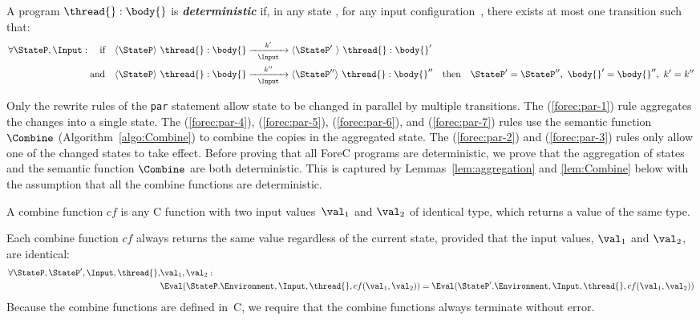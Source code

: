 \begin{definition}
	\label{def:deterministic}
	A program $\thread{}:\body{}$ is \emph{\textbf{deterministic}} if, 
	in any state \StateP{}, for any input configuration~\Input{}, there 
	exists at most one transition such that:
	\begin{align*}
		\forall \StateP, \Input: \quad
		\text{if} \quad
		\langle \StateP \rangle ~ \thread{}:\body{} 
		&	\xrightarrow[~~\Input~~]{k'} 
		\langle \StateP'~ \rangle ~ \thread{}:\body{}'	\\
		\text{and} \quad
		\langle \StateP \rangle ~ \thread{}:\body{} 
		&	\xrightarrow[~~\Input~~]{k''} 
		\langle \StateP'' \rangle ~ \thread{}:\body{}''
		\quad \text{then} \quad 
		\StateP' = \StateP'', ~ \body{}' = \body{}'', ~ k' = k''
	\end{align*}
\end{definition}
Only the rewrite rules of the \verb$par$ statement allow state 
\StateP{} to be changed in parallel by multiple transitions. The
(\ref{forec:par-1}) rule aggregates the changes into a
single state. The (\ref{forec:par-4}), (\ref{forec:par-5}),
(\ref{forec:par-6}), and (\ref{forec:par-7}) rules use the
semantic function $\Combine$ (Algorithm~\ref{algo:Combine})
to combine the copies in the aggregated state. The
(\ref{forec:par-2}) and (\ref{forec:par-3}) rules only allow
one of the changed states to take effect. Before proving
that all ForeC programs are deterministic, we prove that the
aggregation of states and the semantic function $\Combine$
are both deterministic. This is captured by
Lemmas~\ref{lem:aggregation} and \ref{lem:Combine} below
with the assumption that all the combine functions are
deterministic.

\begin{definition}
	\label{def:combine}
	A combine function $cf$ is any C function with two input
	values~$\val_1$ and $\val_2$ of identical type, which
	returns a value of the same type.
\end{definition}

\begin{hypothesis} 
	\label{hyp:combine}
	Each combine function $cf$ always returns the same value regardless
	of the current state, provided that the input values, $\val_1$
	and $\val_2$, are identical:
%
	\begin{align*}
		\forall \StateP, \StateP', \Input, \thread{},& \val_1, \val_2:	\\
		\qquad \qquad
		& \Eval(\StateP.\Environment, \Input, \thread{}, cf(\val_1, \val_2)) = \Eval(\StateP'.\Environment, \Input, \thread{}, cf(\val_1, \val_2))
	\end{align*}
%
	Because the combine functions are defined in~C, we require that the
	combine functions always terminate without error.\end{hypothesis}

